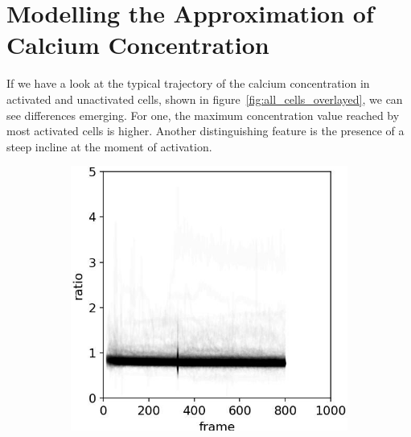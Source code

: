 \chapter{Modelling the Approximation of Calcium Concentration}
\label{chapter:approximating}

If we have a look at the typical trajectory of the calcium concentration in activated and unactivated cells, shown in figure~\ref{fig:all_cells_overlayed}, we can see differences emerging. For one, the maximum concentration value reached by most activated cells is higher. Another distinguishing feature is the presence of a steep incline at the moment of activation.

\begin{figure}[h]
	\centering
	\begin{subfigure}{0.45\linewidth}
		\includegraphics[width=\textwidth]{fig/all_cells_overlayed_mouse_neg}
	\end{subfigure}
	\hfill
	\begin{subfigure}{0.45\linewidth}

\end{subfigure}
\end{figure}
